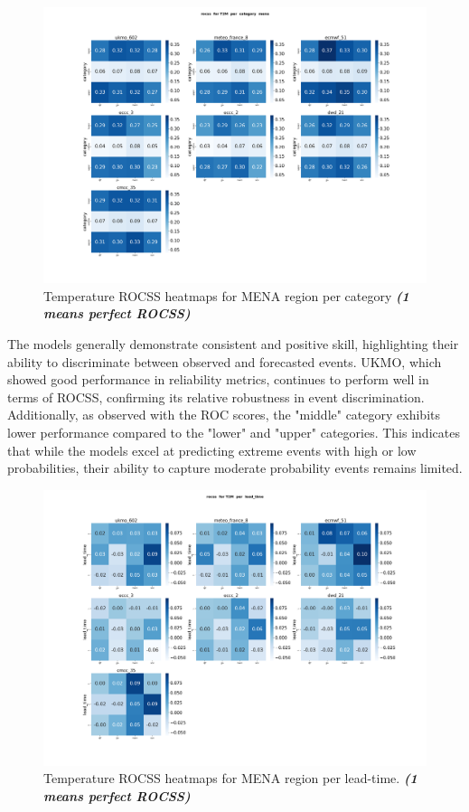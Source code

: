 \begin{figure}[H]
    \centering
    \includegraphics[width=1\linewidth]{plots/prob/rocss/rocss_T2M_category_mena.png}
    \caption{Temperature ROCSS  heatmaps for MENA region per category \textbf{\textit{(1 means perfect ROCSS)}} }
\end{figure}
The models generally demonstrate consistent and positive skill, highlighting their ability to discriminate between observed and forecasted events. UKMO, which showed good performance in reliability metrics, continues to perform well in terms of ROCSS, confirming its relative robustness in event discrimination. Additionally, as observed with the ROC scores, the "middle" category exhibits lower performance compared to the "lower" and "upper" categories. This indicates that while the models excel at predicting extreme events with high or low probabilities, their ability to capture moderate probability events remains limited.

\begin{figure}[H]
    \centering
    \includegraphics[width=1\linewidth]{plots/prob/rocss/rocss_T2M_lead_time.png}
    \caption{Temperature ROCSS  heatmaps for MENA region per lead-time. \textbf{\textit{(1 means perfect ROCSS)}} }
\end{figure}


